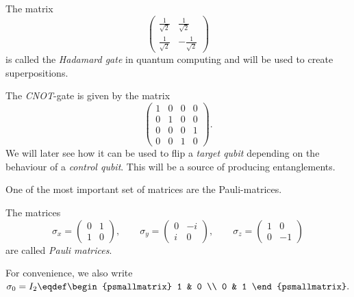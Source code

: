 \documentclass[a4paper,oneside, 12pt]{amsart}
\begin{document}
\begin{example}\label{ex:Hadamard-and-cnot-gate}
  The  matrix
  \begin{equation*}
    \begin{pmatrix}
      \tfrac{1}{\sqrt{2}} & \tfrac{1}{\sqrt{2}} \\
      \tfrac{1}{\sqrt{2}} & -\tfrac{1}{\sqrt{2}}
    \end{pmatrix}
  \end{equation*}
  is called the \emph{Hadamard gate} in quantum computing and will be used to create superpositions.

  The \emph{CNOT}-gate is given by the matrix
  \begin{equation*}
    \begin{pmatrix}
      1 & 0 & 0 & 0 \\
      0 & 1 & 0 & 0 \\
      0 & 0 & 0 & 1 \\
      0 & 0 & 1 & 0
    \end{pmatrix}.
  \end{equation*}
  We will later see how it can be used to flip a \emph{target qubit} depending on the behaviour of a \emph{control qubit}.
  This will be a source of producing entanglements.
\end{example}

One of the most important set of matrices are the Pauli-matrices.
\begin{definition}\label{def:Pauli-matrices}
  The matrices
  \begin{equation*}
    \sigma_x =
    \begin{pmatrix}
      0& 1 \\ 1& 0
    \end{pmatrix}, \qquad
    \sigma_{y} =
    \begin{pmatrix}
      0 & -i \\ i & 0
    \end{pmatrix},\qquad
    \sigma_{z} =
    \begin{pmatrix}
      1 & 0 \\ 0 & -1
    \end{pmatrix}
  \end{equation*}
  are called \emph{Pauli matrices}.
\end{definition}
For convenience, we also write \(\sigma_{0} = I_{2}\eqdef
\begin{psmallmatrix}
  1 & 0 \\ 0 & 1
\end{psmallmatrix}.
\)
\end{document}
